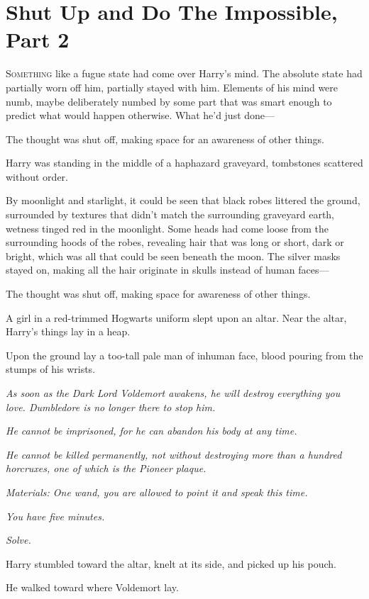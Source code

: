 \chapter{Shut Up and Do The Impossible, Part 2}

\lettrine{S}{omething} like a fugue state had come over Harry's mind. The absolute state had
partially worn off him, partially stayed with him. Elements of his mind were
numb, maybe deliberately numbed by some part that was smart enough to predict
what would happen otherwise. What he'd just done—

The thought was shut off, making space for an awareness of other things.

Harry was standing in the middle of a haphazard graveyard, tombstones scattered
without order.

By moonlight and starlight, it could be seen that black robes littered the
ground, surrounded by textures that didn't match the surrounding graveyard
earth, wetness tinged red in the moonlight. Some heads had come loose from the
surrounding hoods of the robes, revealing hair that was long or short, dark or
bright, which was all that could be seen beneath the moon. The silver masks
stayed on, making all the hair originate in skulls instead of human faces—

The thought was shut off, making space for awareness of other things.

A girl in a red-trimmed Hogwarts uniform slept upon an altar. Near the altar,
Harry's things lay in a heap.

Upon the ground lay a too-tall pale man of inhuman face, blood pouring from the
stumps of his wrists.

\emph{As soon as the Dark Lord Voldemort awakens, he will destroy everything
you love. Dumbledore is no longer there to stop him.}

\emph{He cannot be imprisoned, for he can abandon his body at any time.}

\emph{He cannot be killed permanently, not without destroying more than a
hundred horcruxes, one of which is the Pioneer plaque.}

\emph{Materials: One wand, you are allowed to point it and speak this time.}

\emph{You have five minutes.}

\emph{Solve.}

Harry stumbled toward the altar, knelt at its side, and picked up his pouch.

He walked toward where Voldemort lay.

